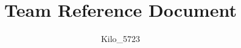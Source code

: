\documentclass[landscape]{article}
\begin{document}
\title{Team Reference Document}
\author{Kilo\_5723}
\maketitle
\newpage
\begin{multicols}{2}
    \tableofcontents
    \newpage
    \setcounter{page}{1}
    \footnotesize
    
    
    
    
    
    
    
\end{multicols}
\end{document}
